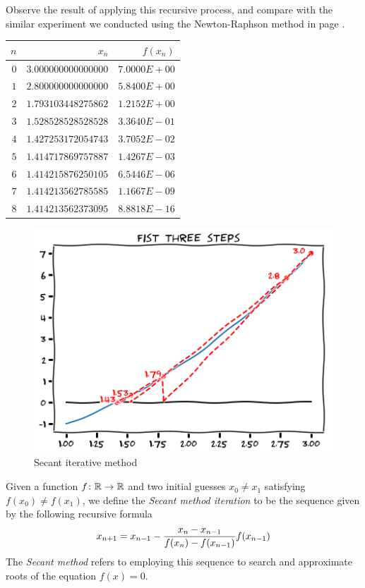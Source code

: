 \begin{example}
Observe the result of applying this recursive process, and compare with the similar experiment we conducted using the Newton-Raphson method in page \pageref{table:Newton-Raphson}.
\begin{center}
\begin{tabular}{|r|r|r|} \hline
$n$ & $x_n$ & $f(x_n)$ \\ \hline \hline
$0$ & $3.000000000000000$ & $7.0000E+00$ \\ \hline
$1$ & $2.800000000000000$ & $5.8400E+00$ \\ \hline
$2$ & $1.793103448275862$ & $1.2152E+00$ \\ \hline
$3$ & $1.528528528528528$ & $3.3640E-01$ \\ \hline
$4$ & $1.427253172054743$ & $3.7052E-02$ \\ \hline
$5$ & $1.414717869757887$ & $1.4267E-03$ \\ \hline
$6$ & $1.414215876250105$ & $6.5446E-06$ \\ \hline
$7$ & $1.414213562785585$ & $1.1667E-09$ \\ \hline
$8$ & $1.414213562373095$ & $8.8818E-16$ \\ \hline
\end{tabular}
\end{center}
\begin{figure}[ht!]
\includegraphics[width=0.6\linewidth]{images/secant.png}
\caption{Secant iterative method}\label{figure:SecantMethod}
\end{figure}
\end{example}

\begin{definition}\label{def:SecantMethod}
Given a function $f \colon \mathbb{R} \to \mathbb{R}$ and two initial guesses $x_0 \neq x_1$ satisfying $f(x_0) \neq f(x_1)$, we define the \emph{Secant method iteration} to be the sequence given by the following recursive formula
\begin{equation*}\label{equation:SecantMethod}\index{Secant method!iteration}
	x_{n+1} = x_{n-1} - \frac{x_n - x_{n-1}}{f(x_n) - f(x_{n-1})}f(x_{n-1})
\end{equation*}
The \emph{Secant method} refers to employing this sequence to search and approximate roots of the equation $f(x)=0$.
\end{definition}